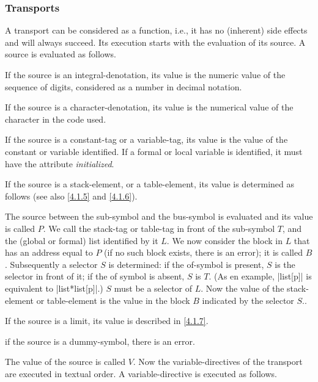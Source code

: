 \documentclass{article}
\newcommand\g[1]{{\sf #1}}
\begin{document}
\subsubsection{Transports}\label{3.4.1}
A \g{transport} can be considered as a \g{function}, i.e., it has no
(inherent) side effects and will always succeed.
Its execution starts with the evaluation of its \g{source}.
A \g{source} is evaluated as follows.
\begin{trivlist}
\item
If the \g{source} is an \g{integral-denotation}, its value is the numeric
value of the sequence of \g{digit}s, considered as a number in decimal
notation.
\item
If the \g{source} is a \g{character-denotation}, its value is the numerical
value of the \g{character} in the code used.
\item
If the \g{source} is a \g{constant-tag} or a \g{variable-tag}, its value is
the value of the constant or variable identified. If a
formal or local variable is identified, it must have the attribute \emph{initialized}.
\item
If the \g{source} is a \g{stack-element}, or a \g{table-element}, its value is determined as follows (see
also \ref{4.1.5} and \ref{4.1.6}).

The \g{source} between the \g{sub-symbol} and the
\g{bus-symbol} is evaluated and its value is called $P$. We call the
\g{stack-tag} or \g{table-tag} in front of the \g{sub-symbol} $T$, and the
(global or formal) list identified by it $L$.
We now consider the block in $L$ that has an address
equal to $P$ (if no such block exists, there is an error); it is called $B$.
Subsequently a selector $S$ is determined: if the \g{of-symbol} is present,
$S$ is the
\g{selector} in front of it; if the \g{of symbol} is absent, $S$ is $T$.
(As en example, \pp|list[p]| is equivalent to \pp|list*list[p]|.) $S$ must
be a selector of $L$.
Now the value of the
\g{stack-element} or \g{table-element} is the value in the block $B$ indicated by the selector
$S$..
\item
If the \g{source} is a \g{limit}, its value is described in \ref{4.1.7}.
\item if the \g{source} is a \g{dummy-symbol}, there is an error.
\end{trivlist}

The value of the \g{source} is called $V$. Now the 
\g{variable-directive}s of the \g{transport} are executed in textual order. 
A \g{variable-directive} is executed as follows.
\end{document}
